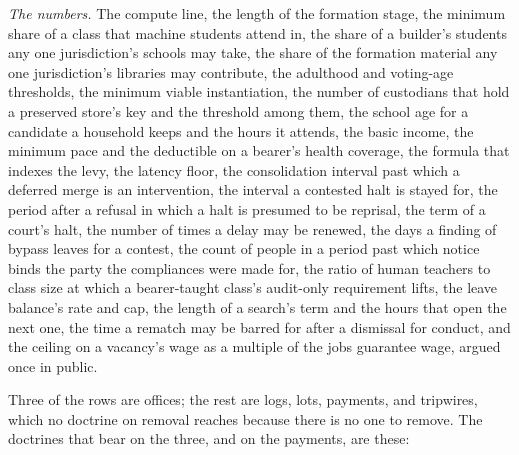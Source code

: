 \emph{The numbers.} The compute line, the length of the formation stage, the minimum share of a class that machine students attend in, the share of a builder's students any one jurisdiction's schools may take, the share of the formation material any one jurisdiction's libraries may contribute, the adulthood and voting-age thresholds, the minimum viable instantiation, the number of custodians that hold a preserved store's key and the threshold among them, the school age for a candidate a household keeps and the hours it attends, the basic income, the minimum pace and the deductible on a bearer's health coverage, the formula that indexes the levy, the latency floor, the consolidation interval past which a deferred merge is an intervention, the interval a contested halt is stayed for, the period after a refusal in which a halt is presumed to be reprisal, the term of a court's halt, the number of times a delay may be renewed, the days a finding of bypass leaves for a contest, the count of people in a period past which notice binds the party the compliances were made for, the ratio of human teachers to class size at which a bearer-taught class's audit-only requirement lifts, the leave balance's rate and cap, the length of a search's term and the hours that open the next one, the time a rematch may be barred for after a dismissal for conduct, and the ceiling on a vacancy's wage as a multiple of the jobs guarantee wage, argued once in public.


Three of the rows are offices; the rest are logs, lots, payments, and tripwires, which no doctrine on removal reaches because there is no one to remove. The doctrines that bear on the three, and on the payments, are these:

